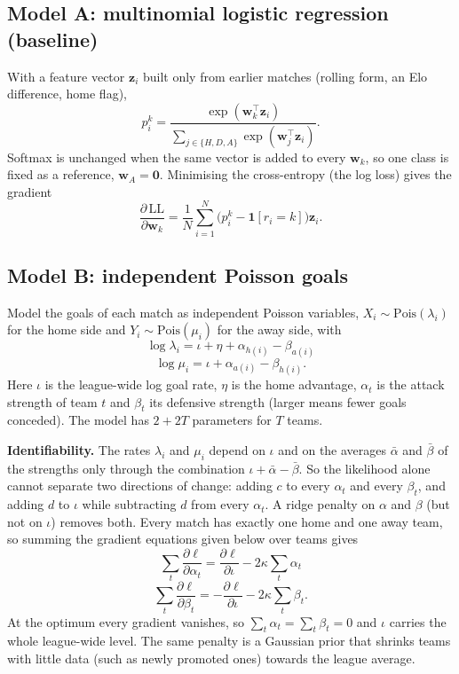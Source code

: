 \documentclass[12pt,a4paper]{article}
\begin{document}
\subsection{Model A: multinomial logistic regression (baseline)}

With a feature vector $\mathbf z_i$ built only from earlier matches (rolling form, an Elo
difference, home flag),
\[
p_i^{k}=\frac{\exp(\mathbf w_k^{\top}\mathbf z_i)}{\displaystyle\sum_{j\in\{H,D,A\}}\exp(\mathbf w_j^{\top}\mathbf z_i)} .
\]
Softmax is unchanged when the same vector is added to every $\mathbf w_k$, so one class is fixed as a
reference, $\mathbf w_A=\mathbf 0$. Minimising the cross-entropy (the log loss) gives the gradient
\[
\frac{\partial\,\mathrm{LL}}{\partial\mathbf w_k}=\frac{1}{N}\sum_{i=1}^{N}\bigl(p_i^{k}-\mathbf 1[r_i=k]\bigr)\mathbf z_i .
\]

\subsection{Model B: independent Poisson goals}

Model the goals of each match as independent Poisson variables, $X_i\sim\mathrm{Pois}(\lambda_i)$ for
the home side and $Y_i\sim\mathrm{Pois}(\mu_i)$ for the away side, with
\[
\log\lambda_i=\iota+\eta+\alpha_{h(i)}-\beta_{a(i)}
\]
\[
\log\mu_i=\iota+\alpha_{a(i)}-\beta_{h(i)} .
\]
Here $\iota$ is the league-wide log goal rate, $\eta$ is the home advantage, $\alpha_t$ is the attack
strength of team $t$ and $\beta_t$ its defensive strength (larger means fewer goals conceded). The
model has $2+2T$ parameters for $T$ teams.

\textbf{Identifiability.} The rates $\lambda_i$ and $\mu_i$ depend on $\iota$ and on the averages
$\bar\alpha$ and $\bar\beta$ of the strengths only through the combination $\iota+\bar\alpha-\bar\beta$.
So the likelihood alone cannot separate two directions of change: adding $c$ to every $\alpha_t$ and
every $\beta_t$, and adding $d$ to $\iota$ while subtracting $d$ from every $\alpha_t$. A ridge penalty
on $\alpha$ and $\beta$ (but not on $\iota$) removes both. Every match has exactly one home and one
away team, so summing the gradient equations given below over teams gives
\[
\sum_t\frac{\partial\ell}{\partial\alpha_t}=\frac{\partial\ell}{\partial\iota}-2\kappa\sum_t\alpha_t
\]
\[
\sum_t\frac{\partial\ell}{\partial\beta_t}=-\frac{\partial\ell}{\partial\iota}-2\kappa\sum_t\beta_t .
\]
At the optimum every gradient vanishes, so $\sum_t\alpha_t=\sum_t\beta_t=0$ and $\iota$ carries the whole
league-wide level. The same penalty is a Gaussian prior that shrinks teams with little data (such as
newly promoted ones) towards the league average.
\end{document}
